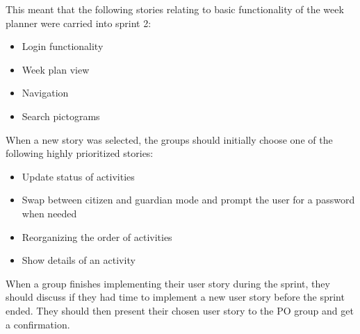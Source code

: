 This meant that the following stories relating to basic functionality of the week planner were carried into sprint 2:
\begin{itemize}
    \item Login functionality
    \item Week plan view
    \item Navigation
    \item Search pictograms
\end{itemize}
When a new story was selected, the groups should initially choose one of the following highly prioritized stories:
\begin{itemize}
    \item Update status of activities
    \item Swap between citizen and guardian mode and prompt the user for a password when needed
    \item Reorganizing the order of activities
    \item Show details of an activity
\end{itemize}
When a group finishes implementing their user story during the sprint, they should discuss if they had time to implement a new user story before the sprint ended. They should then present their chosen user story to the PO group and get a confirmation.

